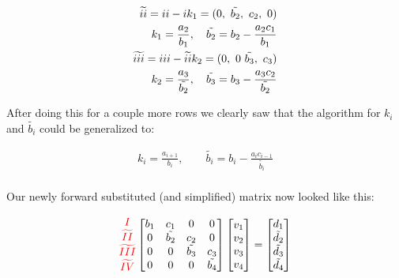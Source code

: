\documentclass[12pt]{article}
\newcommand{\RNum}[1]{\uppercase\expandafter{\romannumeral #1\relax}}
\begin{document}
\begin{align*}
    \widetilde{\RNum{2}} = \RNum{2} - \RNum{1}  k_1 = (0, \ \tilde{b_2}, \ c_2, \ 0)     \\
    k_1 = \frac{a_2}{b_1}, \ \ \ \tilde{b_2} = b_2 - \frac{a_2 c_1}{b_1} \\
    \widetilde{\RNum{3}} = \RNum{3} - \widetilde{\RNum{2}}  k_2 = (0, \ 0 \ \tilde{b_3}, \ c_3) \\
    k_2 = \frac{a_3}{\tilde{b_2}}, \ \ \ \tilde{b_3} = b_3 - \frac{a_3 c_2}{\tilde{b_2}}\\
\end{align*}

\noindent After doing this for a couple more rows we clearly saw that the algorithm for $k_i$ and $\tilde{b_i}$ could be generalized to:

\begin{align*}
    k_i = \frac{a_{i+1}}{b_i}, \qquad \tilde{b_i} = b_i - \frac{a_i c_{i-1}}{\tilde{b_i}} \\
\end{align*}

\noindent Our newly forward substituted (and simplified) matrix now looked like this:

\begin{align*}
    \begin{matrix}
        \textcolor{red}{I} \\
        \textcolor{red}{\widetilde{II}} \\
        \textcolor{red}{\widetilde{III}} \\
        \textcolor{red}{\widetilde{IV}}
    \end{matrix}
    \begin{bmatrix}
        {b_1} & {c_1}        & 0           & 0        \\
        0     & \tilde{b_2}  & {c_2}       & 0     \\
        0     & 0            & \tilde{b_3} & {c_3}  \\
        0     & 0            & 0           & \tilde{b_4}  \\
    \end{bmatrix}
    \begin{bmatrix}
        v_1 \\
        v_2 \\
        v_3 \\
        v_4
    \end{bmatrix}
    =
    \begin{bmatrix}
        d_1 \\
        \tilde{d_2} \\
        \tilde{d_3} \\
        \tilde{d_4} \\
    \end{bmatrix}
\end{align*}
\end{document}

